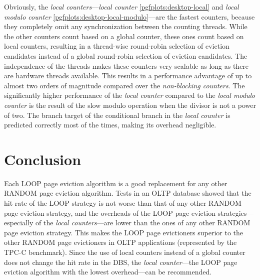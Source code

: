 \begin{@empty}
    Obviously, the \emph{local counters}---\emph{local counter} \ref{pgfplots:desktop-local} and \emph{local modulo counter} \ref{pgfplots:desktop-local-modulo}---are the fastest counters, because they completely omit any synchronization between the counting threads. While the other counters count based on a global counter, these ones count based on local counters, resulting in a thread-wise round-robin selection of eviction candidates instead of a global round-robin selection of eviction candidates. The independence of the threads makes these counters very scalable as long as there are hardware threads available. This results in a performance advantage of up to almost two orders of magnitude compared over the \emph{non-blocking counters}. The significantly higher performance of the \emph{local counter} compared to the \emph{local modulo counter} is the result of the slow modulo operation when the divisor is not a power of two. The branch target of the conditional branch in the \emph{local counter} is predicted correctly most of the times, making its overhead negligible.
\end{@empty}

\section{Conclusion}

    Each LOOP page eviction algorithm is a good replacement for any other RANDOM page eviction algorithm. Tests in an OLTP database showed that the hit rate of the LOOP strategy is not worse than that of any other RANDOM page eviction strategy, and the overheads of the LOOP page eviction strategies---especially of the \emph{local counters}---are lower than the ones of any other RANDOM page eviction strategy. This makes the LOOP page evictioners superior to the other RANDOM page evictioners in OLTP applications (represented by the TPC-C benchmark). Since the use of local counters instead of a global counter does not change the hit rate in the DBS, the \emph{local counter}---the LOOP page eviction algorithm with the lowest overhead---can be recommended.
